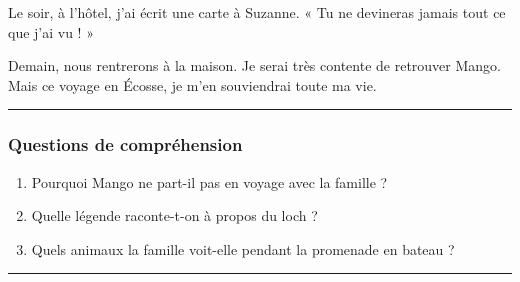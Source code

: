 \documentclass[
  french,
  french,
  14pt,
  a4paper]{extarticle}
\providecommand{\tightlist}{%
  \setlength{\itemsep}{0pt}\setlength{\parskip}{0pt}}
\begin{document}
{Le soir, à l'hôtel, j'ai écrit une carte à Suzanne. « Tu ne devineras
jamais tout ce que j'ai vu ! »

Demain, nous rentrerons à la maison. Je serai très contente de retrouver
Mango. Mais ce voyage en Écosse, je m'en souviendrai toute ma vie.

\begin{center}\rule{0.5\linewidth}{0.5pt}\end{center}

\subsubsection{Questions de
compréhension}\label{questions-de-compruxe9hension-12}

\begin{enumerate}
\def\labelenumi{\arabic{enumi}.}
\tightlist
\item
  Pourquoi Mango ne part-il pas en voyage avec la famille ?
\item
  Quelle légende raconte-t-on à propos du loch ?
\item
  Quels animaux la famille voit-elle pendant la promenade en bateau ?
\end{enumerate}

\begin{center}\rule{0.5\linewidth}{0.5pt}\end{center}

}%
\newpage
\end{document}
